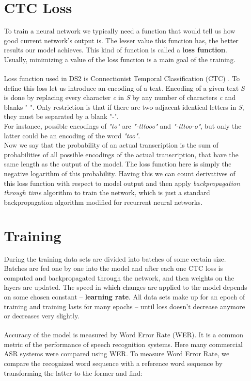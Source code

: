 \documentclass[licencjacka,en]{pracamgr}
\begin{document}
\section{CTC Loss}
To train a neural network we typically need a function that would tell us how good current network's output is. The lesser value this function has, the better results our model achieves. This kind of function is called a \textbf{loss function}. Usually, minimizing a value of the loss function is a main goal of the training. \\\\
Loss function used in DS2 is Connectionist Temporal Classification (CTC) \cite{DS3}. To define this loss let us introduce an encoding of a text. Encoding of a given text \textit{S} is done by replacing every character \textit{c} in \textit{S} by any number of characters \textit{c} and blanks "-". Only restriction is that if there are two adjacent identical letters in \textit{S}, they must be separated by a blank "-".\\
For instance, possible encodings of \textit{"to"} are \textit{"-tttooo"} and \textit{"-tttoo-o"}, but only the latter could be an encoding of the word \textit{"too"}.\\
Now we say that the probability of an actual transcription is the sum of probabilities of all possible encodings of the actual transcription, that have the same length as the output of the model. The loss function here is simply the negative logarithm of this probability. Having this we can count derivatives of this loss function with respect to model output and then apply \textit{backpropagation through time} algorithm to train the network, which is just a standard backpropagation algorithm modified for recurrent neural networks.
\section{Training}
During the training data sets are divided into batches of some certain size. Batches are fed one by one into the model and after each one CTC loss is computed and backpropagated through the network, and then weights on the layers are updated. The speed in which changes are applied to the model depends on some chosen constant -- \textbf{learning rate}. All data sets make up for an epoch of training and training lasts for many epochs -- until loss doesn't decrease anymore or decreases very slightly.\\\\
Accuracy of the model is measured by Word Error Rate (WER). It is a common metric of the performance of speech recognition systems. Here \cite{DS8} many commercial ASR systems were compared using WER. To measure Word Error Rate, we compare the recognized word sequence with a reference word sequence by transforming the latter to the former and find:
\end{document}
